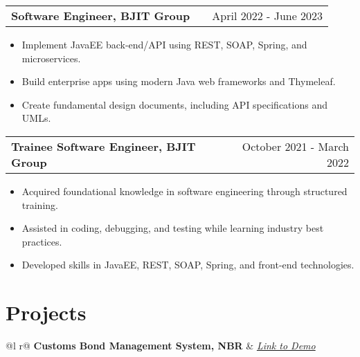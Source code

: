 \documentclass[a4paper, 12pt]{article}
\makeatletter
\newenvironment{joblong}[2]{
    \begin{tabularx}
    {\linewidth}{@{}l X r@{}}
        \textbf{#1} & \hfill & #2 \\[3.75pt]
    \end{tabularx}
    \begin{minipage}[t]{\linewidth}
        \begin{itemize}[nosep,after=\strut, leftmargin=1em,
            itemsep=3pt,label=\textbullet] }{ \end{itemize}
    \end{minipage} }
\makeatother
\begin{document}
    \begin{joblong}
    {Software Engineer, BJIT Group}{April 2022 - June 2023}
        \item Implement
        JavaEE back-end/API using REST, SOAP, Spring, and microservices. \item Build
        enterprise apps using modern Java web frameworks and Thymeleaf. \item Create
        fundamental design documents, including API specifications and UMLs.
    \end{joblong}

    \begin{joblong}
    {Trainee Software Engineer, BJIT Group}{October 2021 - March 2022}
        \item
        Acquired foundational knowledge in software engineering through structured
        training. \item Assisted in coding, debugging, and testing while learning industry
        best practices. \item Developed skills in JavaEE, REST, SOAP, Spring, and
        front-end technologies.
    \end{joblong}


    \section{\textbf{Projects}}
    \begin{tabularx}
    {\linewidth}{ @{}l r@{} }
        \textbf{Customs Bond Management System, NBR} & \hfill
        \textit{\href{https://cusbond.gov.bd/}{Link to Demo}} \\[3.75pt]
        \\
    \end{tabularx}
\end{document}
